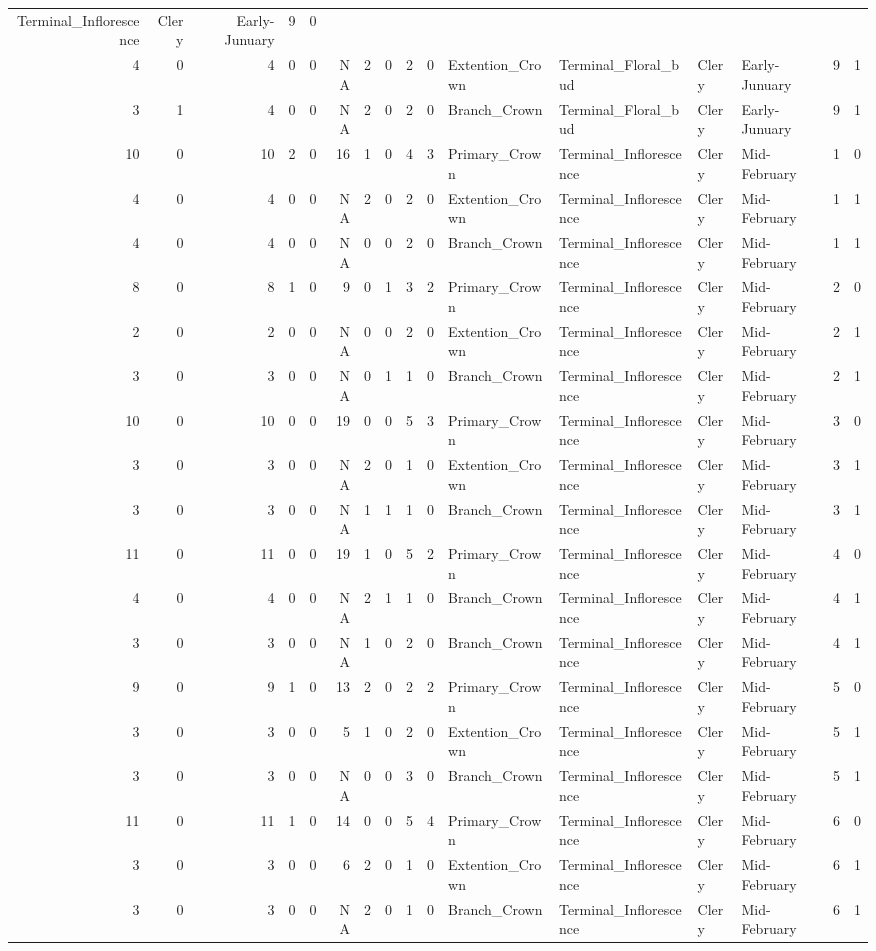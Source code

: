 \documentclass[]{article}
\begin{document}
\begin{longtable}[]{@{}rrrrrrrrrrllllrl@{}}
Terminal\_Inflorescence & Clery & Early-Junuary & 9 & 0\tabularnewline
4 & 0 & 4 & 0 & 0 & NA & 2 & 0 & 2 & 0 & Extention\_Crown &
Terminal\_Floral\_bud & Clery & Early-Junuary & 9 & 1\tabularnewline
3 & 1 & 4 & 0 & 0 & NA & 2 & 0 & 2 & 0 & Branch\_Crown &
Terminal\_Floral\_bud & Clery & Early-Junuary & 9 & 1\tabularnewline
10 & 0 & 10 & 2 & 0 & 16 & 1 & 0 & 4 & 3 & Primary\_Crown &
Terminal\_Inflorescence & Clery & Mid-February & 1 & 0\tabularnewline
4 & 0 & 4 & 0 & 0 & NA & 2 & 0 & 2 & 0 & Extention\_Crown &
Terminal\_Inflorescence & Clery & Mid-February & 1 & 1\tabularnewline
4 & 0 & 4 & 0 & 0 & NA & 0 & 0 & 2 & 0 & Branch\_Crown &
Terminal\_Inflorescence & Clery & Mid-February & 1 & 1\tabularnewline
8 & 0 & 8 & 1 & 0 & 9 & 0 & 1 & 3 & 2 & Primary\_Crown &
Terminal\_Inflorescence & Clery & Mid-February & 2 & 0\tabularnewline
2 & 0 & 2 & 0 & 0 & NA & 0 & 0 & 2 & 0 & Extention\_Crown &
Terminal\_Inflorescence & Clery & Mid-February & 2 & 1\tabularnewline
3 & 0 & 3 & 0 & 0 & NA & 0 & 1 & 1 & 0 & Branch\_Crown &
Terminal\_Inflorescence & Clery & Mid-February & 2 & 1\tabularnewline
10 & 0 & 10 & 0 & 0 & 19 & 0 & 0 & 5 & 3 & Primary\_Crown &
Terminal\_Inflorescence & Clery & Mid-February & 3 & 0\tabularnewline
3 & 0 & 3 & 0 & 0 & NA & 2 & 0 & 1 & 0 & Extention\_Crown &
Terminal\_Inflorescence & Clery & Mid-February & 3 & 1\tabularnewline
3 & 0 & 3 & 0 & 0 & NA & 1 & 1 & 1 & 0 & Branch\_Crown &
Terminal\_Inflorescence & Clery & Mid-February & 3 & 1\tabularnewline
11 & 0 & 11 & 0 & 0 & 19 & 1 & 0 & 5 & 2 & Primary\_Crown &
Terminal\_Inflorescence & Clery & Mid-February & 4 & 0\tabularnewline
4 & 0 & 4 & 0 & 0 & NA & 2 & 1 & 1 & 0 & Branch\_Crown &
Terminal\_Inflorescence & Clery & Mid-February & 4 & 1\tabularnewline
3 & 0 & 3 & 0 & 0 & NA & 1 & 0 & 2 & 0 & Branch\_Crown &
Terminal\_Inflorescence & Clery & Mid-February & 4 & 1\tabularnewline
9 & 0 & 9 & 1 & 0 & 13 & 2 & 0 & 2 & 2 & Primary\_Crown &
Terminal\_Inflorescence & Clery & Mid-February & 5 & 0\tabularnewline
3 & 0 & 3 & 0 & 0 & 5 & 1 & 0 & 2 & 0 & Extention\_Crown &
Terminal\_Inflorescence & Clery & Mid-February & 5 & 1\tabularnewline
3 & 0 & 3 & 0 & 0 & NA & 0 & 0 & 3 & 0 & Branch\_Crown &
Terminal\_Inflorescence & Clery & Mid-February & 5 & 1\tabularnewline
11 & 0 & 11 & 1 & 0 & 14 & 0 & 0 & 5 & 4 & Primary\_Crown &
Terminal\_Inflorescence & Clery & Mid-February & 6 & 0\tabularnewline
3 & 0 & 3 & 0 & 0 & 6 & 2 & 0 & 1 & 0 & Extention\_Crown &
Terminal\_Inflorescence & Clery & Mid-February & 6 & 1\tabularnewline
3 & 0 & 3 & 0 & 0 & NA & 2 & 0 & 1 & 0 & Branch\_Crown &
Terminal\_Inflorescence & Clery & Mid-February & 6 & 1\tabularnewline

\end{longtable}
\end{document}
